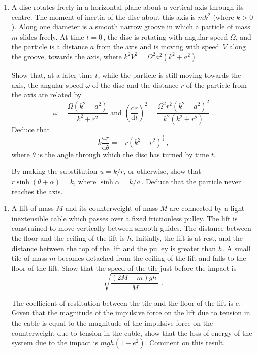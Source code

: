 \documentclass[a4, 11pt]{report}
\newlength{\qspace}
\newcounter{qnumber}
\newenvironment{question}%
 {\vspace{\qspace}
  \begin{enumerate}[\bfseries 1\quad][10]%
    \setcounter{enumi}{\value{qnumber}}%
    \item%
 }
{
  \end{enumerate}
  \filbreak
  \stepcounter{qnumber}
 }
\def\d{{\mathrm d}}
\begin{document}
\begin{question}	
A disc rotates freely  in a horizontal plane about a vertical axis
through its centre. The moment of inertia of the disc about this axis
is $mk^2$ (where $k>0$). Along one diameter is a smooth narrow 
groove in which a particle of 
mass $m$ slides freely. At time $t=0\,$, the disc is rotating with angular 
speed $\Omega$, and the particle is a distance $a$ from the axis and
is moving with speed~$V$ along the groove, towards
the axis, where 
$k^2V^2 = \Omega^2a^2(k^2+a^2)\,$.

Show that, at a later time $t$, while the particle is still moving towards
the axis, the angular speed $\omega$ of the disc and the distance $r$ of 
the particle from the axis are related by
\[
\omega = \frac{\Omega(k^2+a^2)}{k^2+r^2}
\text{ \ \ and \ \ }
\left(\frac{\d r}{\d t}\right)^{\!2} = \frac{\Omega^2r^2(k^2+a^2)^2}{k^2(k^2+r^2)}\;.
\]
Deduce that 
\[
k\frac{\d r}{\d\theta} = -r(k^2+r^2)^{\frac12}\,,
\]
where $\theta $ is the angle through which the disc has turned by time $t$.

By making the substitution $u=k/r$, or otherwise, show that 
$r\sinh (\theta+\alpha) = k$, where $\sinh \alpha = k/a\,$. Deduce that
the particle never reaches the axis.
\end{question}


\begin{question}
A lift of mass $M$ and 
its counterweight of mass $M$ are connected by a light 
inextensible cable which passes over a fixed frictionless pulley. The lift is
constrained to move vertically between smooth guides. The distance between
the floor and the ceiling of the lift is $h$. Initially, the lift is at
rest, and the distance between the top of the lift and the pulley is
greater than $h$. A small tile of mass $m$ becomes detached from the
ceiling of the lift and falls to the floor of the lift.
Show that the speed of the tile just before the impact
is
\[
\sqrt{\frac{(2M-m)gh \;}{M}}\;.
\]

The coefficient of restitution between the tile 
and the floor of the lift is $e$.
Given that  the magnitude of the impulsive 
force on the lift due to tension in the cable  
is equal to the magnitude of the impulsive force on the counterweight 
due to tension in the cable,
show that the loss of energy of the system due to the impact is $mgh(1-e^2)$.
Comment on this result.
\end{question}
	
\end{document}
